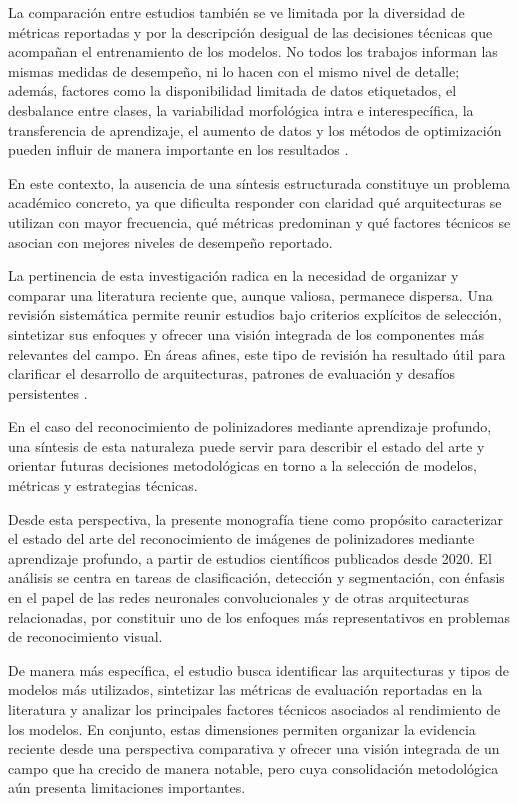 La comparación entre estudios también se ve limitada por la diversidad de métricas reportadas y por la descripción desigual de las decisiones técnicas que acompañan el entrenamiento de los modelos. No todos los trabajos informan las mismas medidas de desempeño, ni lo hacen con el mismo nivel de detalle; además, factores como la disponibilidad limitada de datos etiquetados, el desbalance entre clases, la variabilidad morfológica intra e interespecífica, la transferencia de aprendizaje, el aumento de datos y los métodos de optimización pueden influir de manera importante en los resultados \parencite{khanzhina2022combating}. 

En este contexto, la ausencia de una síntesis estructurada constituye un problema académico concreto, ya que dificulta responder con claridad qué arquitecturas se utilizan con mayor frecuencia, qué métricas predominan y qué factores técnicos se asocian con mejores niveles de desempeño reportado.

La pertinencia de esta investigación radica en la necesidad de organizar y comparar una literatura reciente que, aunque valiosa, permanece dispersa. Una revisión sistemática permite reunir estudios bajo criterios explícitos de selección, sintetizar sus enfoques y ofrecer una visión integrada de los componentes más relevantes del campo. En áreas afines, este tipo de revisión ha resultado útil para clarificar el desarrollo de arquitecturas, patrones de evaluación y desafíos persistentes \parencite{pacal2024systematic,wang2025plantreview}. 

En el caso del reconocimiento de polinizadores mediante aprendizaje profundo, una síntesis de esta naturaleza puede servir para describir el estado del arte y orientar futuras decisiones metodológicas en torno a la selección de modelos, métricas y estrategias técnicas.

Desde esta perspectiva, la presente monografía tiene como propósito caracterizar el estado del arte del reconocimiento de imágenes de polinizadores mediante aprendizaje profundo, a partir de estudios científicos publicados desde 2020. El análisis se centra en tareas de clasificación, detección y segmentación, con énfasis en el papel de las redes neuronales convolucionales y de otras arquitecturas relacionadas, por constituir uno de los enfoques más representativos en problemas de reconocimiento visual.

De manera más específica, el estudio busca identificar las arquitecturas y tipos de modelos más utilizados, sintetizar las métricas de evaluación reportadas en la literatura y analizar los principales factores técnicos asociados al rendimiento de los modelos. En conjunto, estas dimensiones permiten organizar la evidencia reciente desde una perspectiva comparativa y ofrecer una visión integrada de un campo que ha crecido de manera notable, pero cuya consolidación metodológica aún presenta limitaciones importantes.
